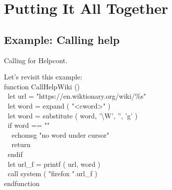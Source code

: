\documentclass{beamer}
\newenvironment{mycode}[0]
{\ttfamily}
{}
\newcommand{\myind}[1]{\textcolor{white}{#1}}
\newcommand{\myident}[1]{\textcolor{identifier}{#1}}
\newcommand{\mykeywd}[1]{\textcolor{keyword}{#1}}
\newcommand{\mystring}[1]{\textcolor{string}{#1}}
\begin{document}

\section{Putting It All Together}

\subsection{Example: Calling help}

\begin{frame}{Calling for Help}{cont.}

	\begin{overprint}

		Let's revisit this example: \\[2mm]
		\begin{mycode}
			\mykeywd{function} CallHelpWiki () \\[2mm]
%
			\myind{..}\mykeywd{let} url {} = \mystring{"https://en.wiktionary.org/wiki/\%s"} \\
			\myind{..}\mykeywd{let} word = \myident{expand} ( \mystring{"<cword>"} ) \\
			\myind{..}\mykeywd{let} word = \myident{substitute} ( word, \mystring{'\textbackslash{}W'}, \mystring{''}, \mystring{'g'} ) \\[2mm]
%
			\myind{..}\mykeywd{if} word == \mystring{""} \\
			\myind{..}\myind{..}\mykeywd{echomsg} \mystring{"no word under cursor"} \\
			\myind{..}\myind{..}\mykeywd{return} \\
			\myind{..}\mykeywd{endif} \\[2mm]
%
			\myind{..}\mykeywd{let} url\_f = \myident{printf} ( url, word ) \\
			\myind{..}\mykeywd{call} \myident{system} ( \mystring{"firefox "}.url\_f ) \\
			\mykeywd{endfunction} \\
		\end{mycode}



\end{overprint}
\end{frame}
\end{document}
